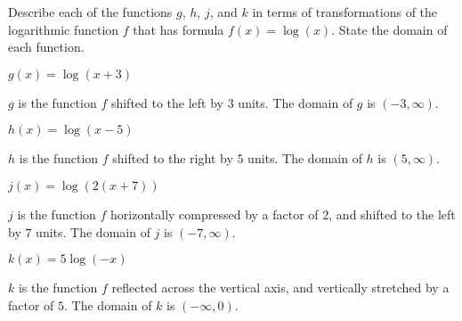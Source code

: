 \begin{exercises}
\begin{problem}[Domain]
\begin{multicols}{4}
\begin{subproblem}
	\end{subproblem}
\end{multicols}
\end{problem}
\begin{problem}
Describe each of the functions $g$, $h$, $j$, and $k$ in terms of transformations 
of the logarithmic function $f$ that has formula $f(x)=\log(x)$. State the domain 
of each function.
\begin{multicols}{4}
	\begin{subproblem}
		$g(x)=\log(x+3)$ 
		\begin{shortsolution}
			$g$ is the function $f$ shifted to the left by $3$ units. The domain
			of $g$ is $(-3,\infty)$.
		\end{shortsolution}
	\end{subproblem}
	\begin{subproblem}
		$h(x)=\log(x-5)$ 
		\begin{shortsolution}
			$h$ is the function $f$ shifted to the right by $5$ units. The domain
			of $h$ is $(5,\infty)$.
		\end{shortsolution}
	\end{subproblem}
	\begin{subproblem}
		$j(x)=\log(2(x+7))$ 
		\begin{shortsolution}
			$j$ is the function $f$ horizontally compressed by a factor of $2$, 
			and shifted to the left by $7$ units. The domain of $j$ is $(-7,\infty)$.
		\end{shortsolution}
	\end{subproblem}
	\begin{subproblem}
		$k(x)=5\log(-x)$ 
		\begin{shortsolution}
			$k$ is the function $f$ reflected across the vertical axis, and vertically
			stretched by a factor of $5$. The domain of $k$ is $(-\infty,0)$.
		\end{shortsolution}
	\end{subproblem}
\end{multicols}
\end{problem}


\end{exercises}
